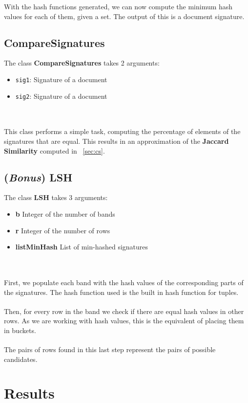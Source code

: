 \documentclass[]{article}
\begin{document}
With the hash functions generated, we can now compute the minimum hash values for each of them, given a set. The output of this is a document signature.

\subsection{CompareSignatures}

The class \textbf{CompareSignatures} takes 2 arguments:
\begin{itemize}
    \item \texttt{sig1}: Signature of a document
    \item \texttt{sig2}: Signature of a document
\end{itemize}
\\
\\
This class performs a simple task, computing the percentage of elements of the signatures that are equal. This results in an approximation of the \textbf{Jaccard Similarity} computed in ~\ref{sec:cs}.

\subsection{(\textit{Bonus}) LSH}

The class \textbf{LSH} takes 3 arguments:
\begin{itemize}

  \item \textbf{b} Integer of the number of bands
  \item \textbf{r} Integer of the number of rows
  \item \textbf{listMinHash} List of min-hashed signatures
  
\end{itemize}\\
\\
First, we populate each band with the hash values of the corresponding parts of the signatures. The hash function used is the built in hash function for tuples.\\
\\
Then, for every row in the band we check if there are equal hash values in other rows. As we are working with hash values, this is the equivalent of placing them in buckets.\\
\\
The pairs of rows found in this last step represent the pairs of possible candidates.

\section{Results}
\end{document}
